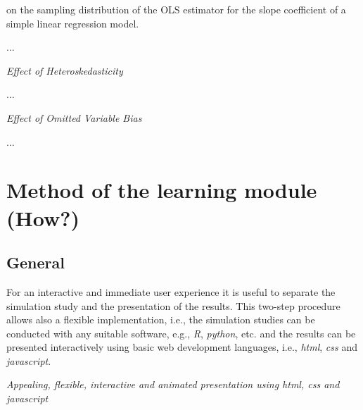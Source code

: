 \documentclass[12pt]{article}
\begin{document}
on the sampling distribution of the OLS estimator for the slope coefficient of a simple linear regression model.

...

\emph{Effect of Heteroskedasticity}


...

\emph{Effect of Omitted Variable Bias}


...

\section{Method of the learning module (How?)}\label{SecHow}

\subsection{General}\label{SecHowGen}

For an interactive and immediate user experience it is useful to separate the simulation study and the presentation of the results. 
%
This two-step procedure allows also a flexible implementation, i.e., the simulation studies can be conducted with any suitable software, e.g., \emph{R}, \emph{python}, etc. and the results can be presented interactively using basic web development languages, i.e., \emph{html}, \emph{css} and \emph{javascript}.

\vspace{1em}
\noindent\emph{Appealing, flexible, interactive and animated presentation using \emph{html}, \emph{css} and \emph{javascript}}
\end{document}
